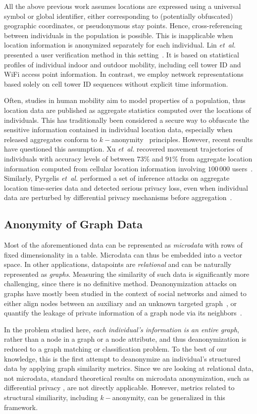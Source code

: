 All the above previous work assumes locations are expressed using a universal symbol or global identifier, either corresponding to (potentially obfuscated) geographic coordinates, or pseudonymous stay points.
Hence, cross-referencing between individuals in the population is possible.
This is inapplicable when location information is anonymized separately for each individual.
Lin \emph{et~al.} presented a user verification method in this setting~\cite{LinMobile}.
It is based on statistical profiles of individual indoor and outdoor mobility, including cell tower ID and WiFi access point information.
In contrast, we employ network representations based solely on cell tower ID sequences without explicit time information.

Often, studies in human mobility aim to model properties of a population, thus location data are published as aggregate statistics computed over the locations of individuals.
This has traditionally been considered a secure way to obfuscate the sensitive information contained in individual location data, especially when released aggregates conform to $ k-$anonymity~\cite{sweeney2002k} principles.
However, recent results have questioned this assumption.
Xu \emph{et~al.} recovered movement trajectories of individuals with accuracy levels of between $73\%$ and $91\%$ from aggregate location information computed from cellular location information involving $100\,000$ users~\cite{xu2017trajectory}. Similarly, Pyrgelis \emph{et~al.} performed a set of inference attacks on aggregate location time-series data and detected serious privacy loss, even when individual data are perturbed by differential privacy mechanisms before aggregation~\cite{pyrgelis2017does}.

\subsection{Anonymity of Graph Data }
Most of the aforementioned data can be represented as \emph{microdata} with rows of fixed dimensionality in a table.
Microdata can thus be embedded into a vector space.
In other applications, datapoints are \emph{relational} and can be naturally represented as \emph{graphs}.
Measuring the similarity of such data is significantly more challenging, since there is no definitive method.
Deanonymization attacks on graphs have mostly been studied in the context of social networks and aimed to either align nodes between an auxiliary and an unknown targeted graph~\cite{narayanan2009anonymizing, sharad2014}, or quantify the leakage of private information of a graph node via its neighbors~\cite{zheleva09}.

In the problem studied here, \emph{each individual's information is an entire graph}, rather than a node in a graph or a node attribute, and thus deanonymization is reduced to a graph matching or classification problem.
To the best of our knowledge, this is the first attempt to deanonymize an individual's structured data by applying graph similarity metrics.
Since we are looking at relational data, not microdata, standard theoretical results on microdata anonymization, such as differential privacy \cite{dwork2006calibrating}, are not directly applicable.
However, metrics related to structural similiarity, including $k-$anonymity, can be generalized in this framework.

